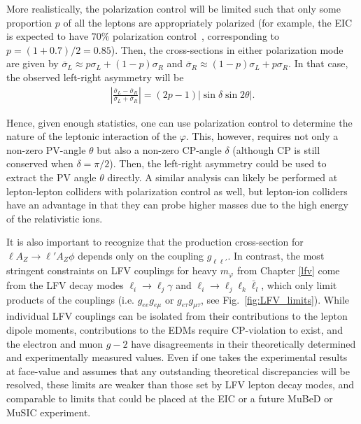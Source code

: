 More realistically, the polarization control will be limited such that only some proportion $p$ of all the leptons are appropriately polarized (for example, the EIC is expected to have $70\%$ polarization control~\cite{AbdulKhalek:2021gbh}, corresponding to $p = (1+0.7)/2 = 0.85$). Then, the cross-sections in either polarization mode are given by $\overline{\sigma}_L \approx p\sigma_L + (1-p)\sigma_R$ and $\overline{\sigma}_R \approx (1-p)\sigma_L + p\sigma_R$. In that case, the observed left-right asymmetry will be
\begin{align}
    \left|\frac{\overline{\sigma}_L - \overline{\sigma}_R}{\overline{\sigma}_L + \overline{\sigma}_R}\right| = (2p - 1)\left|\sin{\delta}\sin{2\theta}\right|.
\end{align}

Hence, given enough statistics, one can use polarization control to determine the nature of the leptonic interaction of the $\varphi$.  This, however, requires not only a non-zero PV-angle $\theta$ but also a non-zero CP-angle $\delta$ (although CP is still conserved when $\delta = \pi/2$). Then, the left-right asymmetry could be used to extract the PV angle $\theta$ directly. A similar analysis can likely be performed at lepton-lepton colliders with polarization control as well, but lepton-ion colliders have an advantage in that they can probe higher masses due to the high energy of the relativistic ions.

It is also important to recognize that the production cross-section for $\ell A_Z \rightarrow \ell'A_Z \phi$ depends only on the coupling $g_{\ell\ell'}$. In contrast, the most stringent constraints on LFV couplings for heavy $m_\varphi$ from Chapter \ref{lfv} come from the LFV decay modes $\ell_i \rightarrow \ell_j\gamma$ and $\ell_i \rightarrow \ell_j\ell_k\bar{\ell}_l$, which only limit products of the couplings (i.e. $g_{ee}g_{e\mu}$ or $g_{e\tau}g_{\mu\tau}$, see Fig.~\ref{fig:LFV_limits}). While individual LFV couplings can be isolated from their contributions to the lepton dipole moments, contributions to the EDMs require CP-violation to exist, and the electron and muon $g-2$ have disagreements in their theoretically determined and experimentally measured values. Even if one takes the experimental results at face-value and assumes that any outstanding theoretical discrepancies will be resolved, these limits are weaker than those set by LFV lepton decay modes, and comparable to limits that could be placed at the EIC or a future MuBeD or MuSIC experiment.



